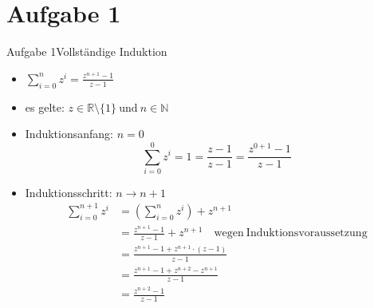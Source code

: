 
\section{Aufgabe 1}

\setcounter{task}{1}

\begin{frame}[allowframebreaks]{Aufgabe 1}{Vollständige Induktion}
  \begin{requirementsnoinc}
    \begin{itemize}
      \item $\displaystyle\sum_{i=0}^{n}z^{i}={\frac{z^{n+1}-1}{z-1}}$
      \item \alert{es gelte:} $\displaystyle z\in\mathbb{R}\setminus\{1\}\ \mathrm{und}\ n\in\mathbb{N}$
    \end{itemize}
  \end{requirementsnoinc}
  \begin{solutionnoinc}
    \begin{itemize}
      \item \alert{Induktionsanfang:} $n=0$
        \[
          \sum_{i=0}^{0}z^{i}=1 = \frac{z-1}{z-1}=\frac{z^{0+1}-1}{z-1} 
        \]
      \item \alert{Induktionsschritt:} $n \to n+1$
        \begin{align*}
          \sum_{i=0}^{n+1}z^{i}&=(\sum_{i=0}^{n}z^{i})+z^{n+1}\\
                               &= \frac{z^{n+1}-1}{z-1}+z^{n+1}\quad\mathrm{wegen~Induktionsvoraussetzung}\\
                               &= \frac{z^{n+1}-1+z^{n+1}\cdot(z-1)}{z-1}\\
                               &= \frac{z^{n+1}-1+z^{n+2}-z^{n+1}}{z-1}\\
                               &= \frac{z^{n+2}-1}{z-1}
        \end{align*}
    \end{itemize}
  \end{solutionnoinc}
\end{frame}
